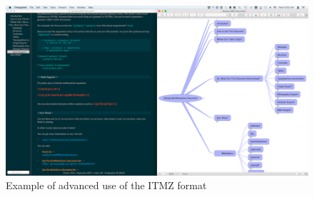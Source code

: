 \begin{figure}[htbp]
\centering
\includegraphics[keepaspectratio,width=\textwidth,height=0.75\textheight]{images/split-view.png}
\caption{Example of advanced use of the ITMZ format}
\end{figure}




